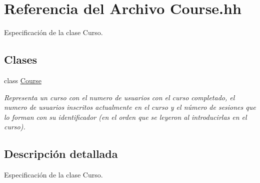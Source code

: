 \hypertarget{_course_8hh}{}\section{Referencia del Archivo Course.\+hh}
\label{_course_8hh}


Especificación de la clase Curso.  


\subsection*{Clases}
\begin{DoxyCompactItemize}
\item 
class \mbox{\hyperlink{class_course}{Course}}
\begin{DoxyCompactList}\small\item\em Representa un curso con el numero de usuarios con el curso completado, el numero de usuarios inscritos actualmente en el curso y el número de sesiones que lo forman con su identificador (en el orden que se leyeron al introducirlas en el curso). \end{DoxyCompactList}\end{DoxyCompactItemize}


\subsection{Descripción detallada}
Especificación de la clase Curso. 

